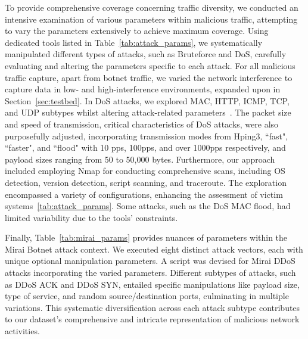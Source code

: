 \documentclass[lettersize,journal]{IEEEtran}
\begin{document}
To provide comprehensive coverage concerning traffic diversity, we conducted an intensive examination of various parameters within malicious traffic, attempting to vary the parameters extensively to achieve maximum coverage. Using dedicated tools listed in Table~\ref{tab:attack_params}, we systematically manipulated different types of attacks, such as Bruteforce and \ac{DoS}, carefully evaluating and altering the parameters specific to each attack. For all malicious traffic capture, apart from botnet traffic, we varied the network interference to capture data in low- and high-interference environments, expanded upon in Section~\ref{sec:testbed}. In \ac{DoS} attacks, we explored MAC, HTTP, ICMP, TCP, and UDP subtypes whilst altering attack-related parameters~\cite{alkasassbeh2016DDoS}. The packet size and speed of transmission, critical characteristics of DoS attacks, were also purposefully adjusted, incorporating transmission modes from Hping3, ``fast", ``faster", and ``flood" with 10 pps, 100pps, and over 1000pps respectively, and payload sizes ranging from 50 to 50,000 bytes. Furthermore, our approach included employing Nmap for conducting comprehensive scans, including OS detection, version detection, script scanning, and traceroute. The exploration encompassed a variety of configurations, enhancing the assessment of victim systems~\ref{tab:attack_params}. Some attacks, such as the DoS MAC flood, had limited variability due to the tools' constraints.

Finally, Table~\ref{tab:mirai_params} provides nuances of parameters within the Mirai Botnet attack context. We executed eight distinct attack vectors, each with unique optional manipulation parameters. A script was devised for Mirai DDoS attacks incorporating the varied parameters. Different subtypes of attacks, such as DDoS ACK and DDoS SYN, entailed specific manipulations like payload size, type of service, and random source/destination ports, culminating in multiple variations. This systematic diversification across each attack subtype contributes to our dataset's comprehensive and intricate representation of malicious network activities.
 
\end{document}
